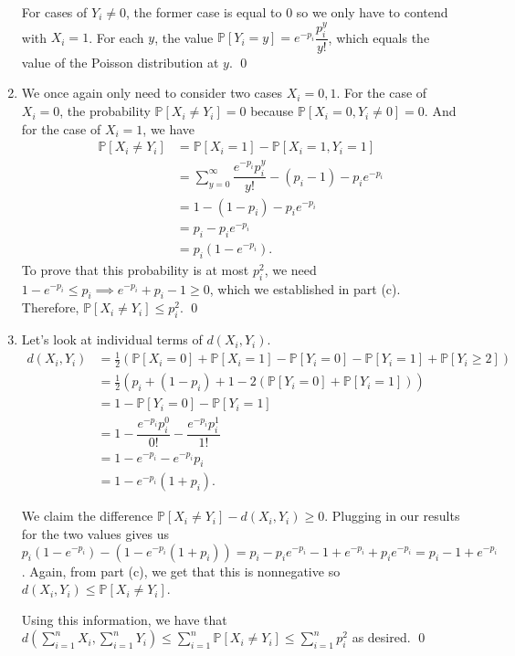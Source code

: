 \documentclass{article}
\newcommand{\p}{\mathbb{P}}
\begin{document}
\begin{enumerate}[label=(\alph*)]
	For cases of $Y_i \neq 0$, the former case is equal to $0$ so we only have to contend with $X_i = 1$. For each $y$, the value $\p[Y_i = y] = e^{-p_i}\dfrac{p_i^y}{y!}$, which equals the value of the Poisson distribution at $y$. \qed
	\item We once again only need to consider two cases $X_i = 0, 1$. For the case of $X_i = 0$, the probability $\p[X_i \neq Y_i] = 0$ because $\p[X_i = 0, Y_i \neq 0] = 0$. And for the case of $X_i = 1$, we have 
	\begin{align*}
		\p[X_i \neq Y_i] &= \p[X_i = 1] - \p[X_i = 1, Y_i = 1] \\
		&= \sum_{y = 0}^\infty \dfrac{e^{-p_i}p_i^y}{y!} - (p_i - 1) - p_ie^{-p_i}\\
		&= 1 - (1 - p_i) - p_ie^{-p_i} \\
		&= p_i - p_ie^{-p_i} \\
		&= p_i(1 - e^{-p_i}).
	\end{align*} 
	To prove that this probability is at most $p_i^2$, we need $1 - e^{-p_i} \leq p_i \implies e^{-p_i} + p_i - 1 \geq 0$, which we established in part (c). Therefore, $\p[X_i \neq Y_i] \leq p_i^2$. \qed
	\item Let's look at individual terms of $d(X_i, Y_i)$. 
	\begin{align*}
		d(X_i, Y_i) &= \frac{1}{2}(\p[X_i = 0] + \p[X_i = 1] - \p[Y_i = 0] - \p[Y_i = 1] + \p[Y_i \geq 2]) \\
		&= \frac{1}{2}(p_i + (1-p_i) + 1 - 2(\p[Y_i = 0] + \p[Y_i = 1])) \\
		&= 1 - \p[Y_i = 0] - \p[Y_i = 1] \\
		&= 1 - \dfrac{e^{-p_i}p_i^0}{0!} - \dfrac{e^{-p_i}p_i^1}{1!} \\
		&= 1 - e^{-p_i} - e^{-p_i}p_i \\
		&= 1 - e^{-p_i}(1 + p_i). 
	\end{align*}

	We claim the difference $\p[X_i \neq Y_i] - d(X_i, Y_i) \geq 0$. Plugging in our results for the two values gives us $p_i(1-e^{-p_i}) - (1-e^{-p_i}(1+p_i)) = p_i - p_ie^{-p_i} - 1 + e^{-p_i} + p_ie^{-p_i} = p_i - 1 + e^{-p_i}$. Again, from part (c), we get that this is nonnegative so $d(X_i, Y_i) \leq \p[X_i \neq Y_i]$. 

	Using this information, we have that $d(\sum_{i=1}^n X_i, \sum_{i=1}^n Y_i) \leq \sum_{i=1}^n \p[X_i \neq Y_i] \leq \sum_{i=1}^n p_i^2$ as desired. \qed
\end{enumerate}
\end{document}
